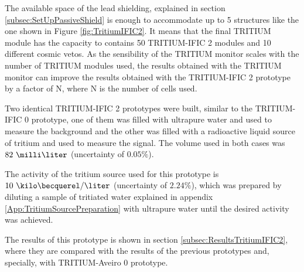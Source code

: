 The available space of the lead shielding, explained in section \ref{subsec:SetUpPassiveShield} is enough to accommodate up to 5 structures like the one shown in Figure \ref{fig:TritiumIFIC2}. It means that the final TRITIUM module has the capacity to contains 50 TRITIUM-IFIC 2 modules and 10 different cosmic vetos. As the sensibility of the TRITIUM monitor scales with the number of TRITIUM modules used, the results obtained with the TRITIUM monitor can improve the results obtained with the TRITIUM-IFIC 2 prototype by a factor of N, where N is the number of cells used.

Two identical TRITIUM-IFIC 2 prototypes were built, similar to the TRITIUM-IFIC 0 prototype, one of them was filled with ultrapure water and used to measure the background and the other was filled with a radioactive liquid source of tritium and used to measure the signal. The volume used in both cases was $82~\milli\liter$ (uncertainty of $0.05\%$).

The activity of the tritium source used for this prototype is $10~\kilo\becquerel/\liter$ (uncertainty of $2.24\%$), which was prepared by diluting a sample of tritiated water explained in appendix \ref{App:TritiumSourcePreparation} with ultrapure water until the desired activity was achieved.

The results of this prototype is shown in section \ref{subsec:ResultsTritiumIFIC2}, where they are compared with the results of the previous prototypes and, specially, with TRITIUM-Aveiro 0 prototype.